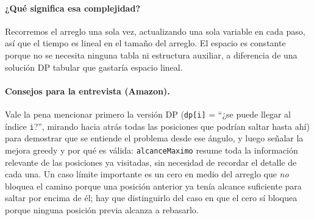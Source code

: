 


\paragraph{¿Qué significa esa complejidad?} Recorremos el arreglo una sola
vez, actualizando una sola variable en cada paso, así que el tiempo es
lineal en el tamaño del arreglo. El espacio es constante porque no se
necesita ninguna tabla ni estructura auxiliar, a diferencia de una solución
DP tabular que gastaría espacio lineal.

\paragraph{Consejos para la entrevista (Amazon).} Vale la pena mencionar
primero la versión DP (\texttt{dp[i]} = ``¿se puede llegar al índice
\texttt{i}?'', mirando hacia atrás todas las posiciones que podrían saltar
hasta ahí) para demostrar que se entiende el problema desde ese ángulo, y
luego señalar la mejora greedy y por qué es válida: \texttt{alcanceMaximo}
resume toda la información relevante de las posiciones ya visitadas, sin
necesidad de recordar el detalle de cada una. Un caso límite importante es
un cero en medio del arreglo que \emph{no} bloquea el camino porque una
posición anterior ya tenía alcance suficiente para saltar por encima de él;
hay que distinguirlo del caso en que el cero sí bloquea porque ninguna
posición previa alcanza a rebasarlo.
